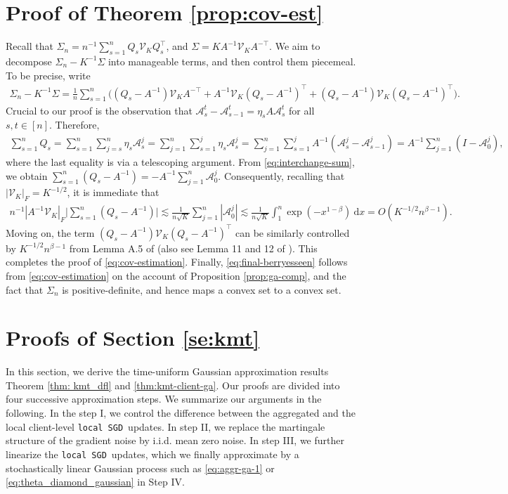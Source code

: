 \documentclass[a4paper,11pt]{article}
\numberwithin{equation}{section}
\theoremstyle{plain}
\theoremstyle{remark}
\newcommand{\DFL}{\texttt{local SGD}}
\newcommand{\Vk}{\mathcal{V}_K}
\begin{document}
\section{Proof of Theorem \ref{prop:cov-est}}\label{proof_thm_2.3}
 Recall that $\Sigma_n=n^{-1} \sum_{s=1}^n Q_s \mathcal{V}_K Q_s^\top$, and $\Sigma= K A^{-1}\Vk A^{-\top}$. We aim to decompose $\Sigma_n - K^{-1}\Sigma$ into manageable terms, and then control them piecemeal. To be precise, write
 \begin{align}
     \Sigma_n -K^{-1}\Sigma = \frac{1}{n}\sum_{s=1}^n\big( (Q_s - A^{-1})\Vk A^{-\top} + A^{-1}\Vk (Q_s-A^{-1})^\top + (Q_s - A^{-1}) \Vk(Q_s - A^{-1})^\top \big).\nonumber
 \end{align}
Crucial to our proof is the observation that $\mathcal{A}_s^t - \mathcal{A}_{s-1}^t =\eta_s A \mathcal{A}_s^t$ for all $s,t \in [n]$. Therefore,   
\begin{align}
    \sum_{s=1}^n Q_s = \sum_{s=1}^n\sum_{j=s}^n \eta_s \mathcal{A}_s^j =\sum_{j=1}^n\sum_{s=1}^j \eta_s \mathcal{A}_s^j = \sum_{j=1}^n\sum_{s=1}^j A^{-1}(\mathcal{A}_s^j - \mathcal{A}_{s-1}^j) =  A^{-1}\sum_{j=1}^n(I - \mathcal{A}_0^j) \label{eq:interchange-sum},
\end{align}
where the last equality is via a telescoping argument. From \eqref{eq:interchange-sum}, we obtain $\sum_{s=1}^n (Q_s - A^{-1})= - A^{-1}\sum_{j=1}^n \mathcal{A}_0^j$. Consequently, recalling that $|\Vk|_F=K^{-1/2}$, it is immediate that 
\begin{align}
  n^{-1} |A^{-1}\Vk|_F \big|\sum_{s=1}^n (Q_s - A^{-1})\big| \lesssim \frac{1}{n\sqrt{K}} \sum_{j=1}^n |\mathcal{A}_0^j| \lesssim \frac{1}{n\sqrt{K}} \int_{1}^n \exp(-x^{1-\beta}) \ \text{d}x= O(K^{-1/2}n^{\beta-1}). \nonumber
  \end{align}
Moving on, the term $(Q_s - A^{-1}) \Vk(Q_s - A^{-1})^\top$ can be similarly controlled by $K^{-1/2} n^{\beta-1}$ from Lemma A.5 of \cite{wu2024statistical} (also see Lemma 11 and 12 of \cite{sheshukova2025gaussian}). This completes the proof of \eqref{eq:cov-estimation}. Finally, \eqref{eq:final-berryesseen} follows from \eqref{eq:cov-estimation} on the account of Proposition \ref{prop:ga-comp}, and the fact that $\Sigma_n$ is positive-definite, and hence maps a convex set to a convex set. 


\section{Proofs of Section \ref{se:kmt}}
In this section, we derive the time-uniform Gaussian approximation results Theorem \ref{thm: kmt_dfl} and \ref{thm:kmt-client-ga}. Our proofs are divided into four successive approximation steps. We summarize our arguments in the following. In the step I, we control the difference between the aggregated and the local client-level \DFL\ updates. In step II, we replace the martingale structure of the gradient noise by i.i.d. mean zero noise. In step III, we further linearize the \DFL\ updates, which we finally approximate by a stochastically linear Gaussian process such as \eqref{eq:aggr-ga-1} or \eqref{eq:theta_diamond_gaussian} in Step IV. 
\end{document}
